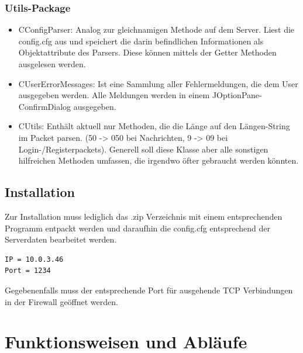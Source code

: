 \documentclass[a4paper,12pt]{scrartcl}
\begin{document}
\subsubsection{Utils-Package}
\begin{itemize}
\item CConfigParser: Analog zur gleichnamigen Methode auf dem Server. Liest die config.cfg aus und speichert die darin befindlichen Informationen als Objektattribute des Parsers. Diese können mittels der Getter Methoden ausgelesen werden.
\item CUserErrorMessages: Ist eine Sammlung aller Fehlermeldungen, die dem User ausgegeben werden. Alle Meldungen werden in einem JOptionPane-ConfirmDialog ausgegeben.
\item CUtils: Enthält aktuell nur Methoden, die die Länge auf den Längen-String im Packet parsen. (50 -> 050 bei Nachrichten, 9 -> 09 bei Login-/Registerpackets). Generell soll diese Klasse aber alle sonstigen hilfreichen Methoden umfassen, die irgendwo öfter gebraucht werden könnten.
\end{itemize}

\subsection{Installation}
Zur Installation muss lediglich das .zip Verzeichnis mit einem entsprechenden Programm entpackt werden und daraufhin die config.cfg entsprechend der Serverdaten bearbeitet werden.
\begin{lstlisting}[frame=single,caption=Beispielinhalt der Konfigurationsdatei]
IP = 10.0.3.46
Port = 1234
\end{lstlisting}

Gegebenenfalls muss der entsprechende Port für ausgehende TCP Verbindungen in der Firewall geöffnet werden.
\clearpage

\section{Funktionsweisen und Abläufe}
\end{document}
